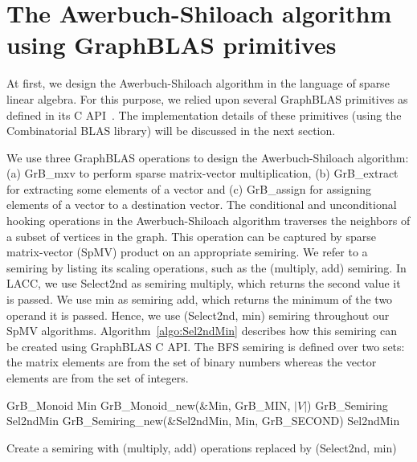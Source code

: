 \section{The Awerbuch-Shiloach algorithm using GraphBLAS primitives}
\label{sec:LACC}
At first, we design the Awerbuch-Shiloach algorithm in the language of sparse linear algebra.
For this purpose, we relied upon several GraphBLAS primitives as defined in its C API~\cite{bulucc2017design}.
The implementation details of these primitives (using the Combinatorial BLAS library) will be discussed in the next section.

We use three GraphBLAS operations to design the Awerbuch-Shiloach algorithm: (a) GrB\_mxv to perform sparse matrix-vector multiplication, (b) GrB\_extract for extracting some elements of a vector and (c) GrB\_assign for assigning elements of a vector to a destination vector. 
The conditional and unconditional hooking operations in the Awerbuch-Shiloach algorithm traverses the neighbors of a subset of vertices  in the graph. This operation can be captured by sparse matrix-vector (SpMV) product on an appropriate semiring.  
We refer to a semiring by listing its scaling operations, such as the (multiply, add) semiring. 
In LACC, we use Select2nd as semiring multiply, which returns the second value it is passed. 
We use min as semiring add, which returns the minimum of the two operand it is passed.
Hence, we use (Select2nd, min) semiring throughout our SpMV algorithms. 
Algorithm~\ref{algo:Sel2ndMin} describes how this semiring can be created using GraphBLAS C API.
The BFS semiring is defined
over two sets: the matrix elements are from the set of binary
numbers whereas the vector elements are from the set of
integers.

\begin{algorithm}[htbp]
\begin{algorithmic}[1]
\begin{small}
	\State GrB\_Monoid Min
	\State GrB\_Monoid\_new(\&Min, GrB\_MIN, $\lvert V \rvert$)
	\State GrB\_Semiring Sel2ndMin
	\State GrB\_Semiring\_new(\&Sel2ndMin, Min, GrB\_SECOND)
	\State \Return Sel2ndMin
\EndProcedure
\end{small}
\end{algorithmic}
\caption{Create a semiring with (multiply, add) operations replaced by (Select2nd, min)}
\label{algo:Sel2ndMin}
\end{algorithm}



